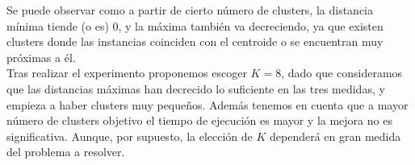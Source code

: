 \documentclass[11pt,a4paper]{article}
\begin{document}
\begin{figure}[h]
\end{figure}


Se puede observar como a partir de cierto número de clusters, la distancia
mínima tiende (o es) 0, y la máxima también va decreciendo, ya que existen
clusters donde las instancias coinciden con el centroide o se
encuentran muy próximas a él. \\

Tras realizar el experimento proponemos escoger $K = 8$, dado que
consideramos que las distancias máximas han decrecido lo suficiente en las
tres medidas, y empieza a haber clusters muy pequeños. Además tenemos en
cuenta que a mayor número de clusters objetivo el tiempo de ejecución es
mayor y la mejora no es significativa. Aunque, por supuesto, la elección de
$K$ dependerá en gran medida del problema a resolver.
\end{document}
